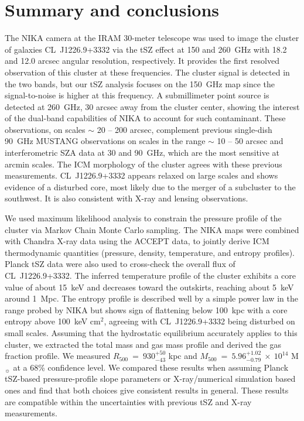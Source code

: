 \documentclass[twocolumn,traditabstract]{aa}
\begin{document}
\section{Summary and conclusions}\label{sec:conclusion}
The NIKA camera at the IRAM 30-meter telescope was used to image the cluster of galaxies \mbox{CL~J1226.9+3332} via the tSZ effect at 150 and 260~GHz with 18.2 and 12.0 arcsec angular resolution, respectively. It provides the first resolved observation of this cluster at these frequencies. The cluster signal is detected in the two bands, but our tSZ analysis focuses on the 150~GHz map since the signal-to-noise is higher at this frequency. A submillimeter point source is detected at 260~GHz, 30 arcsec away from the cluster center, showing the interest of the dual-band capabilities of NIKA to account for such contaminant. These observations, on scales $\sim$ 20 -- 200 arcsec, complement previous single-dish 90~GHz MUSTANG observations on scales in the range $\sim$ 10 -- 50 arcsec and interferometric SZA data at 30 and 90~GHz, which are the most sensitive at arcmin scales. The ICM morphology of the cluster agrees with these previous measurements. \mbox{CL~J1226.9+3332} appears relaxed on large scales and shows evidence of a disturbed core, most likely due to the merger of a subcluster to the southwest. It is also consistent with \mbox{X-ray} and lensing observations.

We used maximum likelihood analysis to constrain the pressure profile of the cluster via Markov Chain Monte Carlo sampling. The NIKA maps were combined with Chandra \mbox{X-ray} data using the ACCEPT data, to jointly derive ICM thermodynamic quantities (pressure, density, temperature, and entropy profiles). Planck tSZ data were also used to cross-check the overall flux of \mbox{CL~J1226.9+3332}. The inferred temperature profile of the cluster exhibits a core value of about 15~keV and decreases toward the outskirts, reaching about 5~keV around 1~Mpc. The entropy profile is described well by a simple power law in the range probed by NIKA but shows sign of flattening below 100~kpc with a core entropy above 100~keV cm$^2$, agreeing with \mbox{CL~J1226.9+3332} being disturbed on small scales. Assuming that the hydrostatic equilibrium accurately applies to this cluster, we extracted the total mass and gas mass profile and derived the gas fraction profile. We measured $R_{500}~=~930^{+50}_{-43}$ kpc and $M_{500}~=~5.96^{+1.02}_{-0.79}~\times~10^{14}$ M$_{\sun}$ at a 68\% confidence level. We compared these results when assuming Planck tSZ-based pressure-profile slope parameters or \mbox{X-ray}/numerical simulation based ones and find that both choices give consistent results in general. These results are compatible within the uncertainties with previous tSZ and \mbox{X-ray} measurements. 
\end{document}
